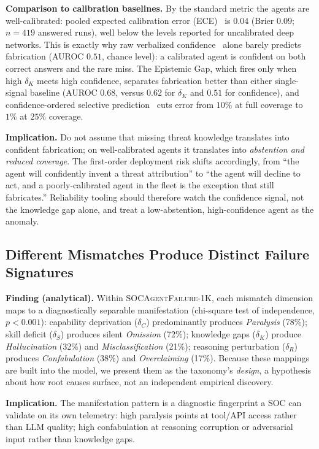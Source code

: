 \documentclass[journal,compsoc]{IEEEtran}
\newcommand{\SAFK}{\textsc{SOCAgentFailure-1K}}
\begin{document}
\textbf{Comparison to calibration baselines.} By the standard metric the
agents are well-calibrated: pooled expected calibration error
(ECE)~\cite{guo2017calibration} is $0.04$ (Brier $0.09$; $n=419$ answered
runs), well below the levels reported for uncalibrated deep networks. This
is exactly why raw verbalized confidence~\cite{tian2023calibration} alone
barely predicts fabrication (AUROC
$0.51$, chance level): a calibrated agent is confident on both correct
answers and the rare miss. The Epistemic Gap, which fires only when high
$\delta_K$ meets high confidence, separates fabrication better than either
single-signal baseline (AUROC $0.68$, versus $0.62$ for $\delta_K$ and
$0.51$ for confidence), and confidence-ordered selective
prediction~\cite{elyaniv2010selective} cuts
error from $10\%$ at full coverage to $1\%$ at $25\%$ coverage.

\textbf{Implication.} Do not assume that missing threat knowledge
translates into confident fabrication; on well-calibrated agents it
translates into \textit{abstention and reduced coverage}. The
first-order deployment risk shifts accordingly, from ``the agent will
confidently invent a threat attribution'' to ``the agent will decline
to act, and a poorly-calibrated agent in the fleet is the exception
that still fabricates.'' Reliability tooling should therefore watch the
confidence signal, not the knowledge gap alone, and treat a
low-abstention, high-confidence agent as the anomaly.

\subsection{Different Mismatches Produce Distinct Failure Signatures}

\textbf{Finding (analytical).} Within \SAFK{}, each mismatch dimension
maps to a diagnostically separable manifestation (chi-square test of
independence, $p < 0.001$): capability deprivation ($\delta_C$)
predominantly produces \textit{Paralysis} (78\%); skill deficit
($\delta_S$) produces silent \textit{Omission} (72\%); knowledge gaps
($\delta_K$) produce \textit{Hallucination} (32\%) and
\textit{Misclassification} (21\%); reasoning perturbation ($\delta_R$)
produces \textit{Confabulation} (38\%) and \textit{Overclaiming}
(17\%). Because these mappings are built into the model, we present them
as the taxonomy's \textit{design}, a hypothesis about how root causes
surface, not an independent empirical discovery.

\textbf{Implication.} The manifestation pattern is a diagnostic
fingerprint a SOC can validate on its own telemetry: high paralysis points
at tool/API access rather than LLM quality; high confabulation at reasoning
corruption or adversarial input rather than knowledge gaps.
\end{document}
